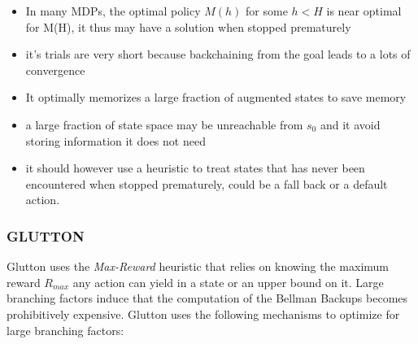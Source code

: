 \documentclass[runningheads,a4paper]{llncs}
\begin{document}
\begin{itemize}
	\item In many MDPs, the optimal policy $M(h)$ for some $h < H$ is near optimal for M(H), it thus may have a solution when stopped prematurely
	\item it's trials are very short because backchaining from the goal leads to a lots of convergence
	\item It optimally memorizes a large fraction of augmented states to save memory
	\item a large fraction of state space may be unreachable from $s_0$ and it avoid storing information it does not need
	\item it should however use a heuristic to treat states that has never been encountered when stopped prematurely, could be a fall back or a default action.
\end{itemize}

\subsubsection{GLUTTON}

Glutton uses the \emph{Max-Reward} heuristic that relies on knowing the maximum reward $R_{max}$ any action can yield in a state or an upper bound on it. Large branching factors induce that the computation of the Bellman Backups becomes prohibitively expensive. Glutton uses the following mechanisms to optimize for large branching factors:
\end{document}
